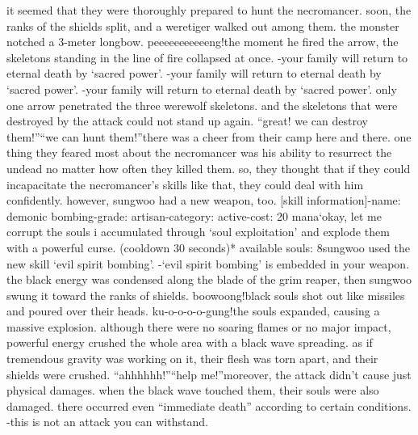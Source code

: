  it seemed that they were thoroughly prepared to hunt the necromancer.
 soon, the ranks of the shields split, and a weretiger walked out among them.
the monster notched a 3-meter longbow.
peeeeeeeeeeeng!the moment he fired the arrow, the skeletons standing in the line of fire collapsed at once.
-your family will return to eternal death by ‘sacred power’.
-your family will return to eternal death by ‘sacred power’.
-your family will return to eternal death by ‘sacred power’.
only one arrow penetrated the three werewolf skeletons.
 and the skeletons that were destroyed by the attack could not stand up again.
“great! we can destroy them!”“we can hunt them!”there was a cheer from their camp here and there.
 one thing they feared most about the necromancer was his ability to resurrect the undead no matter how often they killed them.
so, they thought that if they could incapacitate the necromancer’s skills like that, they could deal with him confidently.
however, sungwoo had a new weapon, too.
[skill information]-name: demonic bombing-grade: artisan-category: active-cost: 20 mana‘okay, let me corrupt the souls i accumulated through ‘soul exploitation’ and explode them with a powerful curse.
 (cooldown 30 seconds)* available souls: 8sungwoo used the new skill ‘evil spirit bombing’.
-‘evil spirit bombing’ is embedded in your weapon.
the black energy was condensed along the blade of the grim reaper, then sungwoo swung it toward the ranks of shields.
boowoong!black souls shot out like missiles and poured over their heads.
ku-o-o-o-o-gung!the souls expanded, causing a massive explosion.
 although there were no soaring flames or no major impact, powerful energy crushed the whole area with a black wave spreading.
as if tremendous gravity was working on it, their flesh was torn apart, and their shields were crushed.
“ahhhhhh!”“help me!”moreover, the attack didn’t cause just physical damages.
 when the black wave touched them, their souls were also damaged.
 there occurred even “immediate death” according to certain conditions.
-this is not an attack you can withstand.


